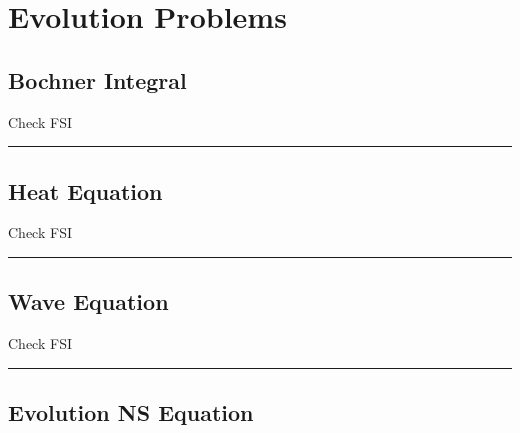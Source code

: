 

\vspace{-1em}

\section{\texorpdfstring{\color{forestgreen(web)}Evolution Problems}{}}



\subsection{\texorpdfstring{\color{red}Bochner Integral}{}}

 
Check FSI

\rule{0.31\textwidth}{0.2pt}


\subsection{\texorpdfstring{\color{red}Heat Equation}{}}


Check FSI

\rule{0.31\textwidth}{0.2pt}


\subsection{\texorpdfstring{\color{red}Wave Equation}{}}


Check FSI

\rule{0.31\textwidth}{0.2pt}


\subsection{\texorpdfstring{\color{red}Evolution NS Equation}{}}

